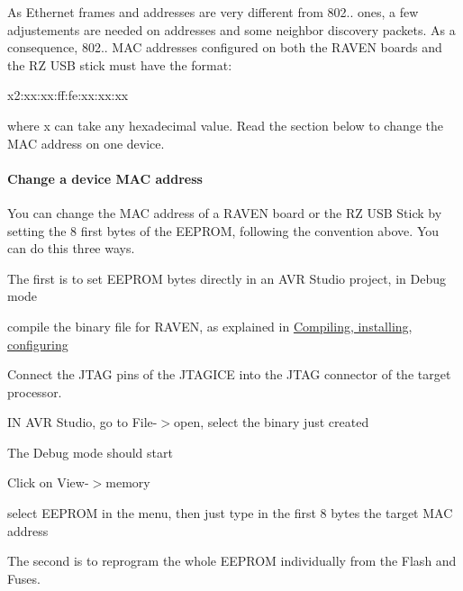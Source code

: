 \-As \-Ethernet frames and addresses are very different from 802.. ones, a few adjustements are needed on addresses and some neighbor discovery packets. \-As a consequence, 802.. \-M\-A\-C addresses configured on both the \-R\-A\-V\-E\-N boards and the \-R\-Z \-U\-S\-B stick must have the format\-:\par
 \begin{DoxyVerb}
x2:xx:xx:ff:fe:xx:xx:xx
\end{DoxyVerb}
 where x can take any hexadecimal value. \-Read the section below to change the \-M\-A\-C address on one device.\hypertarget{a00058_advanced_eeprom}{}\paragraph{\-Change a device M\-A\-C address}\label{a00058_advanced_eeprom}
\-You can change the \-M\-A\-C address of a \-R\-A\-V\-E\-N board or the \-R\-Z \-U\-S\-B \-Stick by setting the 8 first bytes of the \-E\-E\-P\-R\-O\-M, following the convention above. \-You can do this three ways.

\-The first is to set \-E\-E\-P\-R\-O\-M bytes directly in an \-A\-V\-R \-Studio project, in \-Debug mode

\begin{DoxyItemize}
\item compile the binary file for \-R\-A\-V\-E\-N, as explained in \hyperlink{a00058_installation}{\-Compiling, installing, configuring} \item \-Connect the \-J\-T\-A\-G pins of the \-J\-T\-A\-G\-I\-C\-E into the \-J\-T\-A\-G connector of the target processor. \item \-I\-N \-A\-V\-R \-Studio, go to \-File-\/$>$open, select the binary just created \item \-The \-Debug mode should start \item \-Click on \-View-\/$>$memory \item select \-E\-E\-P\-R\-O\-M in the menu, then just type in the first 8 bytes the target \-M\-A\-C address\end{DoxyItemize}
\-The second is to reprogram the whole \-E\-E\-P\-R\-O\-M individually from the \-Flash and \-Fuses.

